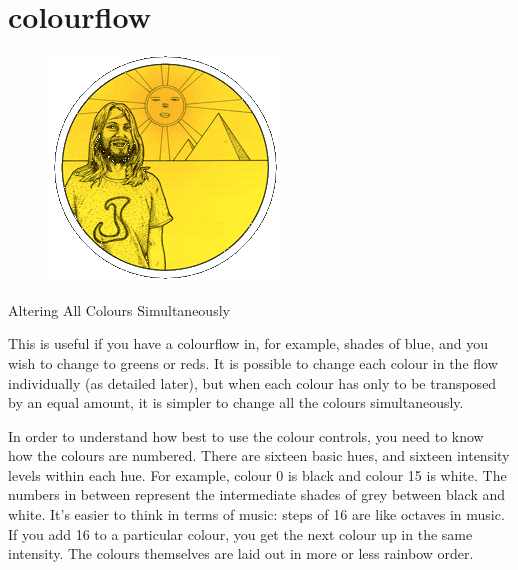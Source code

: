 \chapter{colourflow} 
\label{sec:presets}
\lstset{style=6502Style}
\begin{definition}
\setlength{\intextsep}{0pt}%
\setlength{\columnsep}{3pt}%
\begin{figure}
\includegraphics[width=\linewidth]{src/callout/psych.png} 
\end{figure}
\small
Altering All Colours Simultaneously

This is useful if you have a colourflow in, for example, shades of blue, and
you wish to change to greens or reds.  It is possible to change each colour in
the flow individually (as detailed later), but when each colour has only to be
transposed by an equal amount, it is simpler to change all the colours
simultaneously.

In order to understand how best to use the colour controls, you need to know
how the colours are numbered.  There are sixteen basic hues, and sixteen
intensity levels within each hue.  For example, colour 0 is black and colour 15
is white.  The numbers in between represent the intermediate shades of grey
between black and white.  It's easier to think in terms of music:  steps of 16
are like octaves in music.  If you add 16 to a particular colour, you get the
next colour up in the same intensity.  The colours themselves are laid out in
more or less rainbow order.


\end{definition}
